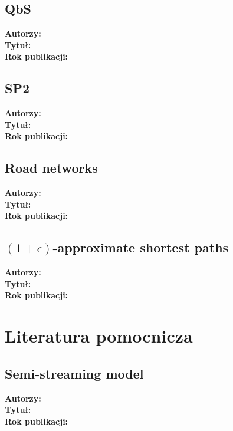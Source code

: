 \documentclass{article}
\begin{document}
        \subsection{QbS\cite{Wang_Wang_Koehler_Lin_2021}}
            \textbf{Autorzy: } \\
            \textbf{Tytuł: } \\
            \textbf{Rok publikacji: } \\

        \subsection{SP2\cite{Dolgorsuren_Xu_Khan_Jeong_Lee_2016}}
            \textbf{Autorzy: } \\
            \textbf{Tytuł: } \\
            \textbf{Rok publikacji: } \\

        \subsection{Road networks\cite{Aggarwal_Gollapudi_Raghavender_Sinop_2021}}
            \textbf{Autorzy: } \\
            \textbf{Tytuł: } \\
            \textbf{Rok publikacji: } \\

        \subsection{$(1+\epsilon)$-approximate shortest paths\cite{Elkin_Trehan_2022}}
            \textbf{Autorzy: } \\
            \textbf{Tytuł: } \\
            \textbf{Rok publikacji: } \\

    \section{Literatura pomocnicza}
        \subsection{Semi-streaming model\cite{Feigenbaum_Kannan_McGregor_Suri_Zhang_2005}}
            \textbf{Autorzy: } \\
            \textbf{Tytuł: } \\
            \textbf{Rok publikacji: } \\
\end{document}
